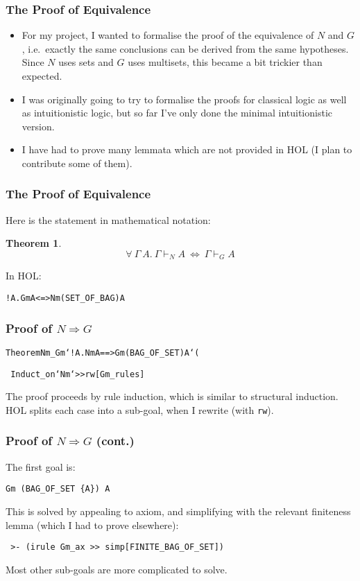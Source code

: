 \documentclass[english,svgnames,hide notes,12pt]{beamer}
\newtheorem{thm}{Theorem}
\theoremstyle{definition}
\theoremstyle{remark}
\begin{document}
\begin{frame}
    \frametitle{The Proof of Equivalence}
    \begin{itemize}
        \item For my project, I wanted to formalise the proof of the equivalence of $N$ and $G$, i.e.\ exactly the same conclusions can be derived from the same hypotheses. Since $N$ uses sets and $G$ uses multisets, this became a bit trickier than expected. 
        \item I was originally going to try to formalise the proofs for classical logic as well as intuitionistic logic, but so far I've only done the minimal intuitionistic version.
        \item I have had to prove many lemmata which are not provided in HOL (I plan to contribute some of them).
    \end{itemize}
\end{frame}

\begin{frame}
    \frametitle{The Proof of Equivalence}
    Here is the statement in mathematical notation:
    \begin{thm}
        \[\forall ~\Gamma ~A. ~\Gamma \vdash_N A ~\Leftrightarrow~ \Gamma \vdash_G A\]
    \end{thm}
    In HOL:

    \begin{alltt}
        !\textGamma A. Gm \textGamma A <=> Nm (SET_OF_BAG \textGamma) A
    \end{alltt}
\end{frame}

\begin{frame}
    \frametitle{Proof of $N\Rightarrow G$}
    \begin{alltt}
        Theorem Nm_Gm `!\textGamma A. Nm \textGamma A ==> Gm (BAG_OF_SET \textGamma) A` (
         
        ~Induct_on `Nm` >> rw[Gm_rules]
    \end{alltt}
    The proof proceeds by rule induction, which is similar to structural induction. HOL splits each case into a sub-goal, when I rewrite (with \texttt{rw}).
\end{frame}

\begin{frame}
    \frametitle{Proof of $N\Rightarrow G$ (cont.)}
    The first goal is:

    \texttt{Gm (BAG_OF_SET \{A\}) A}

    This is solved by appealing to axiom, and simplifying with the relevant finiteness lemma (which I had to prove elsewhere):

    \texttt{
        >- (irule Gm_ax >> 
            simp[FINITE_BAG_OF_SET])
        }

    Most other sub-goals are more complicated to solve.

\end{frame}
\end{document}
